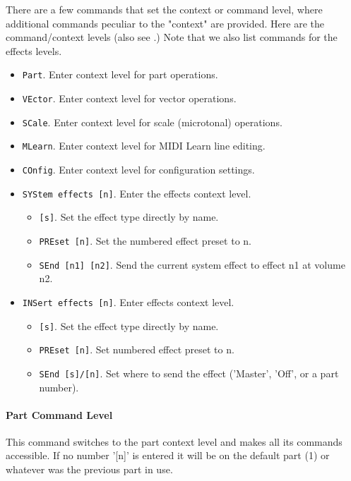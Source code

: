    There are a few commands that set the context or command level, where
   additional commands peculiar to the "context" are provided.  Here are the
   command/context levels
   (also see .)
   Note that we also list commands for the effects levels.

   \begin{itemize}
      \item \texttt{Part}. Enter context level for part operations.
      \item \texttt{VEctor}. Enter context level for vector operations.
      \item \texttt{SCale}. Enter context level for scale (microtonal)
      operations.
      \item \texttt{MLearn}. Enter context level for MIDI Learn line editing.
      \item \texttt{COnfig}. Enter context level for configuration settings.
      \item \texttt{SYStem effects [n]}. Enter the effects context level.
      \begin{itemize}
         \item \texttt{[s]}.  Set the effect type directly by name.
         \item \texttt{PREset [n]}. Set the numbered effect preset to n.
         \item \texttt{SEnd [n1] [n2]}. Send the current system effect to
         effect n1 at volume n2.
      \end{itemize}
      \item \texttt{INSert effects [n]}. Enter effects context level.
      \begin{itemize}
         \item \texttt{[s]}. Set the effect type directly by name.
         \item \texttt{PREset [n]}. Set numbered effect preset to n.
         \item \texttt{SEnd [s]/[n]}. Set where to send the effect
            ('Master', 'Off', or a part number).
      \end{itemize}
   \end{itemize}

\paragraph{Part Command Level}
\label{paragraph:command_line_context_level_part}

   This command switches to the part context level and makes all its commands
   accessible.  If no number '[n]' is entered it will be on the default part
   (1) or whatever was the previous part in use.

